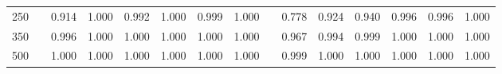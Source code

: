 % 
\begin{tabular}{ccccccccccccccc}
  \hline
  \hline
250 &  & 0.914 & 1.000 & 0.992 & 1.000 & 0.999 & 1.000 &  & 0.778 & 0.924 & 0.940 & 0.996 & 0.996 & 1.000 \\ 
  350 &  & 0.996 & 1.000 & 1.000 & 1.000 & 1.000 & 1.000 &  & 0.967 & 0.994 & 0.999 & 1.000 & 1.000 & 1.000 \\ 
  500 &  & 1.000 & 1.000 & 1.000 & 1.000 & 1.000 & 1.000 &  & 0.999 & 1.000 & 1.000 & 1.000 & 1.000 & 1.000 \\ 
   \hline
\end{tabular}
